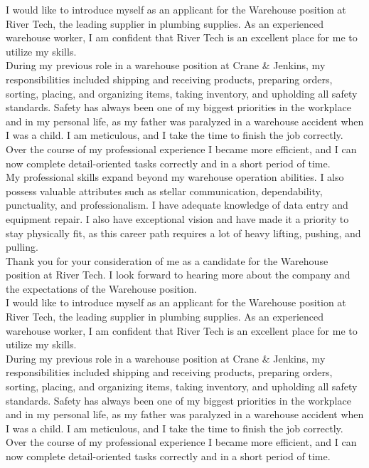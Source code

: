 I would like to introduce myself as an applicant for the Warehouse position at River Tech, the leading supplier in plumbing supplies. As an experienced warehouse worker, I am confident that River Tech is an excellent place for me to utilize my skills. \\

During my previous role in a warehouse position at Crane \& Jenkins, my responsibilities included shipping and receiving products, preparing orders, sorting, placing, and organizing items, taking inventory, and upholding all safety standards. Safety has always been one of my biggest priorities in the workplace and in my personal life, as my father was paralyzed in a warehouse accident when I was a child. I am meticulous, and I take the time to finish the job correctly. Over the course of my professional experience I became more efficient, and I can now complete detail-oriented tasks correctly and in a short period of time.\\

My professional skills expand beyond my warehouse operation abilities. I also possess valuable attributes such as stellar communication, dependability, punctuality, and professionalism. I have adequate knowledge of data entry and equipment repair. I also have exceptional vision and have made it a priority to stay physically fit, as this career path requires a lot of heavy lifting, pushing, and pulling.\\

Thank you for your consideration of me as a candidate for the Warehouse position at River Tech. I look forward to hearing more about the company and the expectations of the Warehouse position.\\

I would like to introduce myself as an applicant for the Warehouse position at River Tech, the leading supplier in plumbing supplies. As an experienced warehouse worker, I am confident that River Tech is an excellent place for me to utilize my skills. \\

During my previous role in a warehouse position at Crane \& Jenkins, my responsibilities included shipping and receiving products, preparing orders, sorting, placing, and organizing items, taking inventory, and upholding all safety standards. Safety has always been one of my biggest priorities in the workplace and in my personal life, as my father was paralyzed in a warehouse accident when I was a child. I am meticulous, and I take the time to finish the job correctly. Over the course of my professional experience I became more efficient, and I can now complete detail-oriented tasks correctly and in a short period of time.\\

